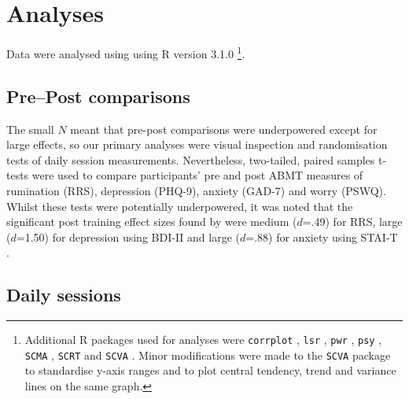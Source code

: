 \documentclass[man,floatsintext,a4paper,biblatex]{apa6}\usepackage[]{graphicx}\usepackage[]{color}
\begin{document}
\section{Analyses}

Data were analysed using using R version 3.1.0
\parencite{rcoreteam_r_2014}\footnote{Additional R packages used for
analyses were \texttt{corrplot} \parencite{wei_corrplot_2013},
\texttt{lsr} \parencite{navarro_learning_2015},
\texttt{pwr} \parencite{champely_pwr_2015}, \texttt{psy}
\parencite{falissard_psy_2012}, \texttt{SCMA} \parencite{bulte_scma_2015},
\texttt{SCRT} \parencite{bulte_scrt_2015} and \texttt{SCVA}
\parencite{bulte_scva_2015}. Minor modifications were made to the
\texttt{SCVA} package to standardise y-axis ranges and to plot
central tendency, trend and variance lines on the same graph.}.

\subsection{Pre--Post comparisons}

The small ${N}$ meant that pre-post comparisons were underpowered except
for large effects, so our primary analyses were visual inspection
and randomisation tests of daily session measurements. Nevertheless,
two-tailed, paired samples t-tests were used to compare participants'
pre and post ABMT measures of rumination (RRS), depression (PHQ-9),
anxiety (GAD-7) and worry (PSWQ). Whilst these tests were potentially
underpowered, it was noted that the significant post training
effect sizes found by \textcite{yang_attention_2015} were medium
(${d}$=.49) for RRS, large (${d}$=1.50) for depression using BDI-II
\parencite{beck_manual_1996} and large
 (${d}$=.88) for anxiety using STAI-T \parencite{spielberger_manual_1983}.

\subsection{Daily sessions}
\end{document}
